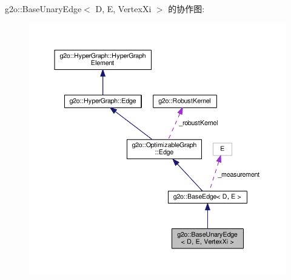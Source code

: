 g2o\-:\-:Base\-Unary\-Edge$<$ D, E, Vertex\-Xi $>$ 的协作图\-:
\nopagebreak
\begin{figure}[H]
\begin{center}
\leavevmode
\includegraphics[width=350pt]{classg2o_1_1BaseUnaryEdge__coll__graph}
\end{center}
\end{figure}

